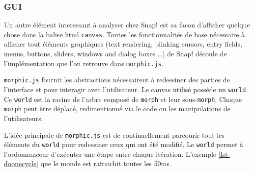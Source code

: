 % 
% 
% 

\subsubsection{GUI}
Un autre élément interessant à analyser chez Snap! est sa facon d'afficher quelque chose dans la balise html \texttt{canvas}. Toutes les fonctionnalités de base nécessaire à afficher tout éléments graphiques (text rendering, blinking cursors, entry fields, menus, buttons, sliders, windows and dialog boxes \ldots) de Snap! découle de l'implémentation que l'on retrouve dans \texttt{morphic.js}.

\texttt{morphic.js} fournit les abstractions nécessairent à redessiner des parties de l'interface et pour interagir avec l'utilisateur. Le canvas utilisé possède un \texttt{world}. Ce \texttt{world} est la racine de l'arbre composé de \texttt{morph} et leur sous-\texttt{morph}. Chaque \texttt{morph} peut être déplacé, redimentionné via le code ou les manipulations de l'utilisateurs.

L'idée principale de \texttt{morphic.js} est de continuellement parcourir tout les éléments du \texttt{world} pour redessiner ceux qui ont été modifié. Le \texttt{world} permet à l'ordonnanceur d'exécuter une étape entre chaque itération. L'exemple \ref{lst-doonecycle} que le monde est rafraichit toutes les 50ms.

